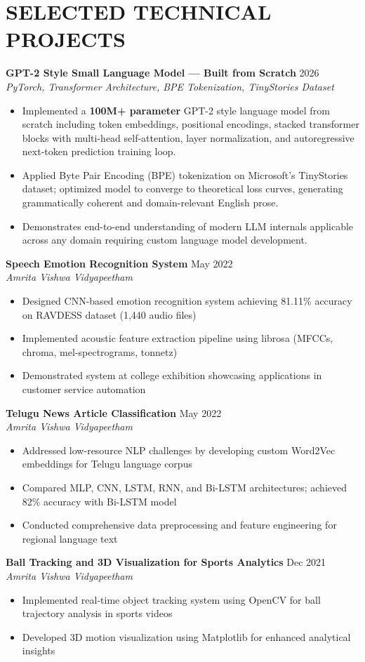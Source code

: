\documentclass[11pt,a4paper]{article}
\newcommand{\CVItem}[1]{\item{#1}}
\newcommand{\CVSubheading}[4]{
  \vspace{2pt}
  \textbf{#1} \hfill #2 \\
  \textit{#3} \hfill \textit{#4}
  \vspace{3pt}
}
\begin{document}
\section{SELECTED TECHNICAL PROJECTS}
\textbf{GPT-2 Style Small Language Model --- Built from Scratch} \hfill 2026 \\
\textit{PyTorch, Transformer Architecture, BPE Tokenization, TinyStories Dataset}
\begin{itemize}
  \item Implemented a \textbf{100M+ parameter} GPT-2 style language model from scratch including token embeddings, positional encodings, stacked transformer blocks with multi-head self-attention, layer normalization, and autoregressive next-token prediction training loop.
  \item Applied Byte Pair Encoding (BPE) tokenization on Microsoft's TinyStories dataset; optimized model to converge to theoretical loss curves, generating grammatically coherent and domain-relevant English prose.
  \item Demonstrates end-to-end understanding of modern LLM internals applicable across any domain requiring custom language model development.
\end{itemize}
\CVSubheading
{Speech Emotion Recognition System}
{May 2022}
{Amrita Vishwa Vidyapeetham}
{}
\begin{itemize}
    \CVItem{Designed CNN-based emotion recognition system achieving 81.11\% accuracy on RAVDESS dataset (1,440 audio files)}
    \CVItem{Implemented acoustic feature extraction pipeline using librosa (MFCCs, chroma, mel-spectrograms, tonnetz)}
    \CVItem{Demonstrated system at college exhibition showcasing applications in customer service automation}
\end{itemize}


\vspace{5mm}
\CVSubheading
{Telugu News Article Classification}
{May 2022}
{Amrita Vishwa Vidyapeetham}
{}
\begin{itemize}
    \CVItem{Addressed low-resource NLP challenges by developing custom Word2Vec embeddings for Telugu language corpus}
    \CVItem{Compared MLP, CNN, LSTM, RNN, and Bi-LSTM architectures; achieved 82\% accuracy with Bi-LSTM model}
    \CVItem{Conducted comprehensive data preprocessing and feature engineering for regional language text}
\end{itemize}

\CVSubheading
{Ball Tracking and 3D Visualization for Sports Analytics}
{Dec 2021}
{Amrita Vishwa Vidyapeetham}
{}
\begin{itemize}
    \CVItem{Implemented real-time object tracking system using OpenCV for ball trajectory analysis in sports videos}
    \CVItem{Developed 3D motion visualization using Matplotlib for enhanced analytical insights}
\end{itemize}
\end{document}

